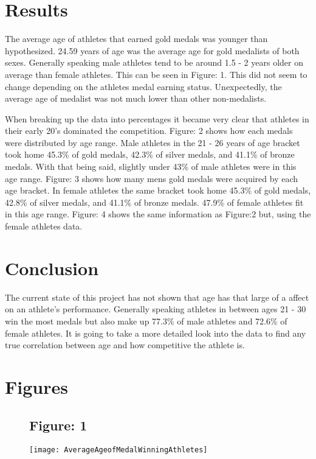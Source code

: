 \documentclass{article}
\begin{document}
\section{Results}
	The average age of athletes that earned gold medals was younger than hypothesized. 24.59 years of age was the average age for gold medalists of both sexes. Generally speaking male athletes tend to be around 1.5 - 2 years older on average than female athletes. This can be seen in Figure: 1. This did not seem to change depending on the athletes medal earning status. Unexpectedly, the average age of medalist was not much lower than other non-medalists.
\bigbreak
\par
\noindent
	When breaking up the data into percentages it became very clear that athletes in their early 20's dominated the competition. Figure: 2 shows how each medals were distributed by age range. Male athletes in the 21 - 26 years of age  bracket took home 45.3\% of gold medals, 42.3\% of silver medals, and 41.1\% of bronze medals. With that being said, slightly under 43\% of male athletes were in this age range. Figure: 3 shows how many mens gold medals were acquired by each age bracket. In female athletes the same bracket took home 45.3\% of gold medals, 42.8\% of silver medals, and 41.1\% of bronze medals.  47.9\% of female athletes fit in this age range. Figure: 4 shows the same information as Figure:2 but, using the female athletes data. 


\section{Conclusion}
	The current state of this project has not shown that age has that large of a affect on an athlete's performance. Generally speaking athletes in between ages 21 - 30 win the most medals but also make up 77.3\% of male athletes and 72.6\% of female athletes. It is going to take a more detailed look into the data to find any true correlation between age and how competitive the athlete is.

\newpage
\section{Figures}

\begin{figure}[ht!]
\centering
\subsection{Figure: 1}
\centering
\texttt{[image: AverageAgeofMedalWinningAthletes]}
\end{figure}
\end{document}

